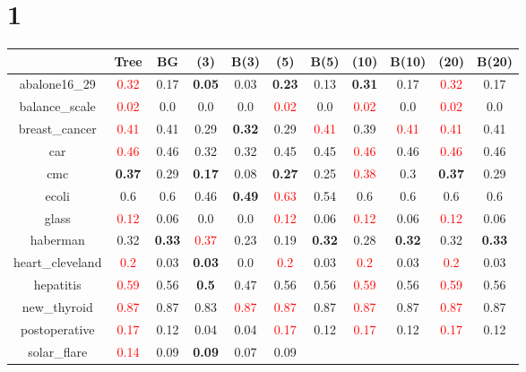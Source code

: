 \documentclass{article}%
\begin{document}
\section*{1}%
\begin{tabular}{c|cccccccccc}%
\hline%
&Tree&BG&(3)&B(3)&(5)&B(5)&(10)&B(10)&(20)&B(20)\\%
\hline%
abalone16\_29&\textcolor{red}{ 
0.32
}&0.17&\textbf{0.05}&0.03&\textbf{0.23}&0.13&\textbf{0.31}&0.17&\textcolor{red}{ 
0.32
}&0.17\\%
\hline%
balance\_scale&\textcolor{red}{ 
0.02
}&0.0&0.0&0.0&\textcolor{red}{ 
0.02
}&0.0&\textcolor{red}{ 
0.02
}&0.0&\textcolor{red}{ 
0.02
}&0.0\\%
\hline%
breast\_cancer&\textcolor{red}{ 
0.41
}&0.41&0.29&\textbf{0.32}&0.29&\textcolor{red}{ 
0.41
}&0.39&\textcolor{red}{ 
0.41
}&\textcolor{red}{ 
0.41
}&0.41\\%
\hline%
car&\textcolor{red}{ 
0.46
}&0.46&0.32&0.32&0.45&0.45&\textcolor{red}{ 
0.46
}&0.46&\textcolor{red}{ 
0.46
}&0.46\\%
\hline%
cmc&\textbf{0.37}&0.29&\textbf{0.17}&0.08&\textbf{0.27}&0.25&\textcolor{red}{ 
0.38
}&0.3&\textbf{0.37}&0.29\\%
\hline%
ecoli&0.6&0.6&0.46&\textbf{0.49}&\textcolor{red}{ 
0.63
}&0.54&0.6&0.6&0.6&0.6\\%
\hline%
glass&\textcolor{red}{ 
0.12
}&0.06&0.0&0.0&\textcolor{red}{ 
0.12
}&0.06&\textcolor{red}{ 
0.12
}&0.06&\textcolor{red}{ 
0.12
}&0.06\\%
\hline%
haberman&0.32&\textbf{0.33}&\textcolor{red}{ 
0.37
}&0.23&0.19&\textbf{0.32}&0.28&\textbf{0.32}&0.32&\textbf{0.33}\\%
\hline%
heart\_cleveland&\textcolor{red}{ 
0.2
}&0.03&\textbf{0.03}&0.0&\textcolor{red}{ 
0.2
}&0.03&\textcolor{red}{ 
0.2
}&0.03&\textcolor{red}{ 
0.2
}&0.03\\%
\hline%
hepatitis&\textcolor{red}{ 
0.59
}&0.56&\textbf{0.5}&0.47&0.56&0.56&\textcolor{red}{ 
0.59
}&0.56&\textcolor{red}{ 
0.59
}&0.56\\%
\hline%
new\_thyroid&\textcolor{red}{ 
0.87
}&0.87&0.83&\textcolor{red}{ 
0.87
}&\textcolor{red}{ 
0.87
}&0.87&\textcolor{red}{ 
0.87
}&0.87&\textcolor{red}{ 
0.87
}&0.87\\%
\hline%
postoperative&\textcolor{red}{ 
0.17
}&0.12&0.04&0.04&\textcolor{red}{ 
0.17
}&0.12&\textcolor{red}{ 
0.17
}&0.12&\textcolor{red}{ 
0.17
}&0.12\\%
\hline%
solar\_flare&\textcolor{red}{ 
0.14
}&0.09&\textbf{0.09}&0.07&0.09&\textcolor{red}{ 
}
\end{tabular}
\end{document}
